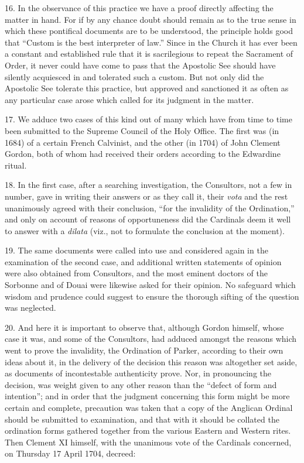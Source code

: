 16. In the observance of this practice we have a proof directly
affecting the matter in hand. For if by any chance doubt should remain
as to the true sense in which these pontifical documents are to be
understood, the principle holds good that ``Custom is the best
interpreter of law.'' Since in the Church it has ever been a constant
and established rule that it is sacrilegious to repeat the Sacrament of
Order, it never could have come to pass that the Apostolic See should
have silently acquiesced in and tolerated such a custom. But not only
did the Apostolic See tolerate this practice, but approved and
sanctioned it as often as any particular case arose which called for its
judgment in the matter.

17. We adduce two cases of this kind out of many which have from time to
time been submitted to the Supreme Council of the Holy Office. The first
was (in 1684) of a certain French Calvinist, and the other (in 1704) of
John Clement Gordon, both of whom had received their orders according to
the Edwardine ritual.

18. In the first case, after a searching investigation, the Consultors,
not a few in number, gave in writing their answers or as they call it,
their \emph{vota} and the rest unanimously agreed with their conclusion,
``for the invalidity of the Ordination,'' and only on account of reasons
of opportuneness did the Cardinals deem it well to answer with a
\emph{dilata} (viz., not to formulate the conclusion at the moment).

19. The same documents were called into use and considered again in the
examination of the second case, and additional written statements of
opinion were also obtained from Consultors, and the most eminent doctors
of the Sorbonne and of Douai were likewise asked for their opinion. No
safeguard which wisdom and prudence could suggest to ensure the thorough
sifting of the question was neglected.

20. And here it is important to observe that, although Gordon himself,
whose case it was, and some of the Consultors, had adduced amongst the
reasons which went to prove the invalidity, the Ordination of Parker,
according to their own ideas about it, in the delivery of the decision
this reason was altogether set aside, as documents of incontestable
authenticity prove. Nor, in pronouncing the decision, was weight given
to any other reason than the ``defect of form and intention''; and in
order that the judgment concerning this form might be more certain and
complete, precaution was taken that a copy of the Anglican Ordinal
should be submitted to examination, and that with it should be collated
the ordination forms gathered together from the various Eastern and
Western rites. Then Clement XI himself, with the unanimous vote of the
Cardinals concerned, on Thursday 17 April 1704, decreed:

